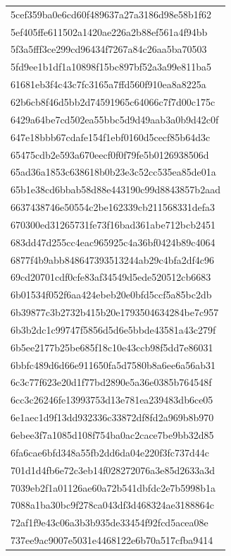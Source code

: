 \begin{tabular}{l}
5cef359ba0e6cd60f489637a27a3186d98e58b1f62 \\
5ef405ffe611502a1420ae226a2b88ef561a4f94bb \\
5f3a5fff3ce299cd96434f7267a84c26aa5ba70503 \\
5fd9ee1b1df1a10898f15bc897bf52a3a99e811ba5 \\
61681eb3f4c43c7fc3165a7ffd560f910ea8a8225a \\
62b6cb8f46d5bb2d74591965c64066c7f7d00c175c \\
6429a64be7cd502ea55bbc5d9d49aab3a0b9d42c0f \\
647e18bbb67cdafe154f1ebf0160d5cecf85b64d3c \\
65475cdb2e593a670eecf0f0f79fe5b0126938506d \\
65ad36a1853c638618b0b23e3c52cc535ea85de01a \\
65b1e38cd6bbab58d88e443190c99d8843857b2aad \\
6637438746e50554c2be162339cb211568331defa3 \\
670300ed31265731fe73f16bad361abe712bcb2451 \\
683dd47d255cc4eac965925c4a36bf0424b89c4064 \\
6877f4b9abb848647393513244ab29c4bfa2df4c96 \\
69cd20701cdf0cfe83af34549d5ede520512cb6683 \\
6b01534f052f6aa424ebeb20e0bfd5ccf5a85bc2db \\
6b39877c3b2732b415b20e1793504634284be7c957 \\
6b3b2dc1c99747f5856d5d6e5bbde43581a43c279f \\
6b5ee2177b25be685f18c10e43ccb98f5dd7e86031 \\
6bbfc489d6d66e911650fa5d7580b8a6ee6a56ab31 \\
6c3c77f623e20d1f77bd2890e5a36e0385b764548f \\
6cc3c26246fe13993753d13e781ea239483db6ce05 \\
6e1aec1d9f13dd932336c33872df8fd2a969b8b970 \\
6ebee3f7a1085d108f754ba0ac2cace7be9bb32d85 \\
6fa6cae6bfd348a55fb2dd6da04e220f3fc737d44c \\
701d1d4fb6e72c3eb14f028272076a3e85d2633a3d \\
7039eb2f1a01126ae60a72b541dbfdc2e7b5998b1a \\
7088a1ba30bc9f278ca043df3d468324ae3188864c \\
72af1f9e43c06a3b3b935de33454f92fcd5acea08e \\
737ee9ac9007e5031e4468122e6b70a517cfba9414 \\

\end{tabular}
